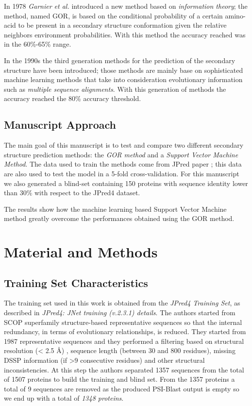 \documentclass[a4paper,twocolumn]{article}
\begin{document}
In 1978 \emph{Garnier et al.} \cite{gor} introduced a new method based on \emph{information theory};
the method, named GOR, is based on the conditional probability of a certain amino-acid to be
present in a secondary structure conformation given the relative neighbors
environment probabilities. With this method the accuracy reached was in the
60\%-65\% range.

In the 1990s the third generation methods for the prediction of the secondary structure have been introduced; those methods are mainly base on sophisticated machine learning methods that take into consideration evolutionary information such as \emph{multiple sequence alignments}.
With this generation of methods the accuracy reached the 80\% accuracy threshold.

\subsection{Manuscript Approach}
\label{sec:org2cfeaa1}
The main goal of this manuscript is to test and compare two different secondary structure prediction methods: the \emph{GOR method} and a \emph{Support Vector Machine Method}.
The data used to train the methods come from JPred paper \cite{jpred} ; this data are also used to
test the model in a 5-fold cross-validation.
For this manuscript we also generated a blind-set containing 150 proteins with sequence identity lower than 30\% with respect to the JPred4 dataset.

The results show how the machine learning based Support Vector Machine method greatly overcome
the performances obtained using the GOR method.


\section{Material and Methods}
\label{sec:org6061a62}
\subsection{Training Set Characteristics}
\label{sec:org3bee4e3}
The training set used in this work is obtained from the \emph{JPred4 Training Set}, \cite{jpred}
as described in \emph{JPred4: JNet training (v.2.3.1) details}. The authors started
from SCOP superfamily structure-based representative sequences \cite{scop} so that
the internal redundancy, in terms of evolutionary relationships, is reduced. They started from 1987
representative sequences and they performed a filtering based on structural resolution (< 2.5 Å) , sequence length (between 30 and 800 residues), missing DSSP information (if >9 consecutive residues) and other structural inconsistencies.
At this step the authors separated 1357 sequences from the total of 1507 proteins to build the training and blind set.
From the 1357 proteins a total of 9 sequences are removed as the produced PSI-Blast output is empty so we end up with a total of \emph{1348 proteins}.
\end{document}
